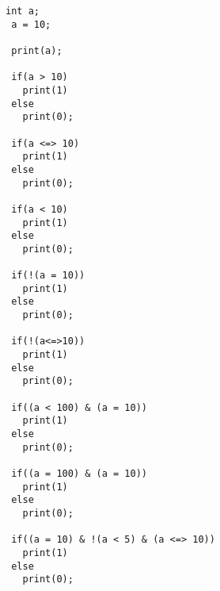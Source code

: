 	 	\begin{lstlisting}[frame=single]
 int a;
 a = 10;
 
 print(a);

 if(a > 10)
   print(1)
 else
   print(0);

 if(a <=> 10)
   print(1)
 else
   print(0);

 if(a < 10)
   print(1)
 else
   print(0);

 if(!(a = 10))
   print(1)
 else
   print(0);

 if(!(a<=>10))
   print(1)
 else
   print(0);

 if((a < 100) & (a = 10))
   print(1)
 else
   print(0);

 if((a = 100) & (a = 10))
   print(1)
 else
   print(0);

 if((a = 10) & !(a < 5) & (a <=> 10))
   print(1)
 else
   print(0);
	 	\end{lstlisting}